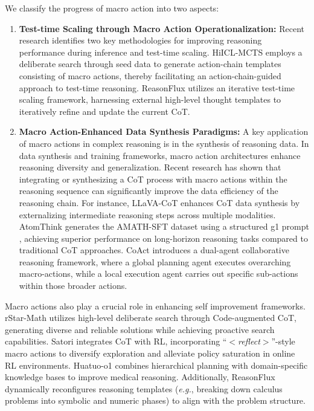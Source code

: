 We classify the progress of macro action into two aspects: 
\begin{enumerate}[itemindent=0em]
\item \textbf{Test-time Scaling through Macro Action Operationalization:} Recent research identifies two key methodologies for improving reasoning performance during inference and test-time scaling. 
HiICL-MCTS \cite{HiICL-MCTS} employs a deliberate search through seed data to generate action-chain templates consisting of macro actions, thereby facilitating an action-chain-guided approach to test-time reasoning. ReasonFlux \cite{ReasonFlux} utilizes an iterative test-time scaling framework, harnessing external high-level thought templates to iteratively refine and update the current CoT.



\item \textbf{Macro Action-Enhanced Data Synthesis Paradigms:} A key application of macro actions in complex reasoning is in the synthesis of reasoning data. 
In data synthesis and training frameworks, macro action architectures enhance reasoning diversity and generalization. 
Recent research has shown that integrating or synthesizing a CoT process with macro actions within the reasoning sequence can significantly improve the data efficiency of the reasoning chain. 
For instance, LLaVA-CoT \cite{xu2024llava} enhances CoT data synthesis by externalizing intermediate reasoning steps across multiple modalities. 
AtomThink \cite{atomthink} generates the AMATH-SFT dataset using a structured g1 prompt \cite{g1}, achieving superior performance on long-horizon reasoning tasks compared to traditional CoT approaches. 
CoAct \cite{hou2024coact} introduces a dual-agent collaborative reasoning framework, where a global planning agent executes overarching macro-actions, while a local execution agent carries out specific sub-actions within those broader actions.

\end{enumerate}

Macro actions also play a crucial role in enhancing self improvement frameworks. 
rStar-Math \cite{guan2025rstarmathsmallllmsmaster} utilizes high-level deliberate search through Code-augmented CoT, generating diverse and reliable solutions while achieving proactive search capabilities. 
Satori \cite{Satori} integrates CoT with RL, incorporating ``$<$\textit{reflect}$>$''-style macro actions to diversify exploration and alleviate policy saturation in online RL environments. 
Huatuo-o1 \cite{Huatuo-o1} combines hierarchical planning with domain-specific knowledge bases to improve medical reasoning. 
Additionally, ReasonFlux \cite{ReasonFlux} dynamically reconfigures reasoning templates (\emph{e.g.}, breaking down calculus problems into symbolic and numeric phases) to align with the problem structure.





